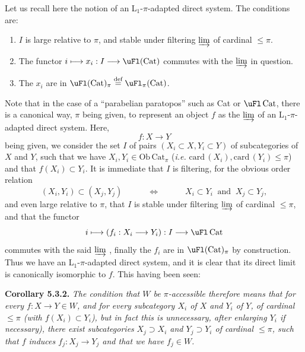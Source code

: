 Let us recall here the notion of an L$_1$-$\pi$-adapted direct system. The conditions are:
\begin{enumerate}[label={}]
\item[1°)] $I$ is large relative to $\pi$, and stable under filtering $\varinjlim$ of cardinal $\leq \pi$.
\item[2°)] The functor $i \longmapsto x_i : I \longrightarrow \uFl(\mathrm{Cat})$ commutes with the $\varinjlim$ in question.
\item[3°)] The $x_i$ are in $\uFl(\mathrm{Cat})_\pi \overset{\text{def}}{=} \uFl_\pi(\mathrm{Cat})$.
\end{enumerate}
Note that in the case of a ``parabelian paratopos'' such as Cat or $\uFl\,\mathrm{Cat}$, there is a canonical way, $\pi$ being given, to represent an object $f$ as the $\varinjlim$ of an L$_1$-$\pi$-adapted direct system. Here,
\[
f : X \longrightarrow Y
\]
being given, we consider the set $I$ of
pairs $(X_i \subset X, Y_i \subset Y)$ of subcategories of $X$ and $Y$, such that we have $X_i, Y_i \in \mathrm{Ob}\,\mathrm{Cat}_\pi$ (\textit{i.e.} $\mathrm{card}\,(X_i), \mathrm{card}\,(Y_i) \leq \pi$) and that $f(X_i) \subset Y_i$. It is immediate that $I$ is filtering, for the obvious order relation
\[
(X_i, Y_i) \subset (X_j, Y_j) \qquad\quad \Longleftrightarrow \qquad\quad X_i \subset Y_i \ \text{ and } \ X_j \subset Y_j, %
\]
and even large relative to $\pi$, that $I$ is stable under filtering $\varinjlim$ of cardinal $\leq \pi$, and that the functor
\[
i \longmapsto (f_i : X_i \longrightarrow Y_i) : I \longrightarrow \uFl\,\mathrm{Cat}
\]
commutes with the said $\varinjlim$ , finally the $f_i$ are in $\uFl(\mathrm{Cat})_\pi$ by construction. Thus we have an L$_1$-$\pi$-adapted direct system, and it is clear that its direct limit is canonically isomorphic to $f$. This having been seen:

\textbf{Corollary 5.3.2.} \textit{The condition that $W$ be $\pi$-accessible therefore means that for every $f : X \longrightarrow Y \in W$, and for every subcategory $X_i$ of $X$ and $Y_i$ of $Y$, of cardinal $\leq \pi$ (with $f(X_i) \subset Y_i$), but in fact this is unnecessary, after enlarging $Y_i$ if necessary), there exist subcategories} %
\textit{$X_j \supset X_i$ and $Y_j \supset Y_i$ of cardinal $\leq \pi$, such that $f$ induces $f_j : X_j \longrightarrow Y_j$ and that we have $f_j \in W$.}

